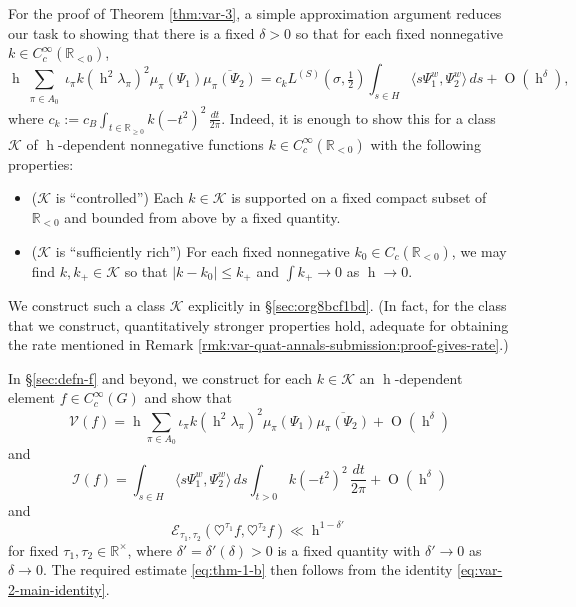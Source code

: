 \documentclass[reqno,10pt]{amsart}
\theoremstyle{plain} %
\theoremstyle{definition}
\theoremstyle{plain} %
\theoremstyle{remark}
\theoremstyle{itplain} %
\theoremstyle{remark} %
\renewcommand{\geq}{\geqslant}
\renewcommand{\leq}{\leqslant}
\numberwithin{equation}{section}
\def\O{\operatorname{O}}
\DeclareMathOperator{\h}{h}
\begin{document}
For the proof of Theorem \ref{thm:var-3}, a simple approximation argument reduces our task to showing that there is a fixed $\delta > 0$ so that for each fixed nonnegative $k \in C_c^\infty(\mathbb{R}_{<0})$,
\begin{equation}\label{eq:thm-1-b}
  \h
  \sum_{
    \substack{
      \pi \in A_0
    }
  }
  \iota_{\pi}
  k(\h^2 \lambda_\pi)^2
  \mu_\pi(\Psi_1)
  \overline{\mu_\pi(\Psi_2)}
  =
  c_k
  L^{(S)}(\sigma,\tfrac{1}{2})
  \int_{s \in H}
  \langle s \Psi_1^w, \Psi_2^w \rangle \,d s + \O(\h^\delta),
\end{equation}
where $c_k := c_B \int_{t \in \mathbb{R}_{\geq 0}} k(-t^2)^2 \, \frac{d t}{2 \pi}$.  Indeed, it is enough to show this for a class $\mathcal{K}$ of $\h$-dependent nonnegative functions $k \in C_c^\infty(\mathbb{R}_{<0})$ with the following properties:
\begin{itemize}
\item ($\mathcal{K}$ is ``controlled'') Each $k \in \mathcal{K}$ is supported on a fixed compact subset of $\mathbb{R}_{<0}$ and bounded from above by a fixed quantity.
\item ($\mathcal{K}$ is ``sufficiently rich'') For each fixed nonnegative $k_0 \in C_c(\mathbb{R}_{<0})$, we may find $k, k_+ \in \mathcal{K}$ so that $|k - k_0| \leq k_+$ and $\int k_+ \rightarrow 0$ as $\h \rightarrow 0$.
\end{itemize}
We construct such a class $\mathcal{K}$ explicitly in \S\ref{sec:org8bcf1bd}.  (In fact, for the class that we construct, quantitatively stronger properties hold, adequate for obtaining the rate mentioned in Remark \ref{rmk:var-quat-annals-submission:proof-gives-rate}.)

In \S\ref{sec:defn-f} and beyond, we construct for each $k \in \mathcal{K}$ an $\h$-dependent element $f \in C_c^\infty(G)$ and show that
\begin{equation}\label{eqn:req-V}
  \mathcal{V}(f)
  = \h \sum_{\pi \in A_0}
  \iota_{\pi} k(\h^2 \lambda_\pi)^2
  \mu_\pi(\Psi_1)
  \overline{\mu_\pi(\Psi_2)}
  + \O(\h^\delta)
\end{equation}
and
\begin{equation}\label{eqn:req-I}
  \mathcal{I}(f)
  = \int_{s \in H} \langle s \Psi_1^w, \Psi_2^w
  \rangle
  \,d s
  \int_{t > 0}
  k(-t^2)^2 \, \frac{d t}{2 \pi} 
  + \O(\h^\delta)
\end{equation}
and
\begin{equation}\label{eqn:req-E}
  \mathcal{E}_{\tau_1,\tau_2}(
  \heartsuit^{\tau_1} f,
  \heartsuit^{\tau_2} f)
  \ll \h^{1-\delta'}
\end{equation}
for fixed $\tau_1, \tau_2 \in \mathbb{R}^\times$, where $\delta' = \delta'(\delta) > 0$ is a fixed quantity with $\delta' \rightarrow 0$ as $\delta \rightarrow 0$.  The required estimate \eqref{eq:thm-1-b} then follows from the identity \eqref{eq:var-2-main-identity}.
\end{document}
